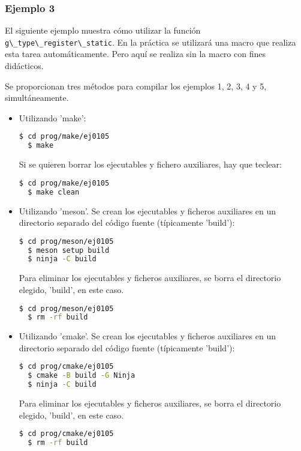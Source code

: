 \subsubsection{Ejemplo 3}
El siguiente ejemplo muestra cómo utilizar la función \passthrough{\lstinline!g\_type\_register\_static!}.
En la práctica se utilizará una macro que realiza esta tarea automáticamente. Pero aquí se realiza sin
la macro con fines didácticos.

Se proporcionan tres métodos para compilar los ejemplos 1, 2, 3, 4 y 5, simultáneamente.
\begin{itemize}
  \tightlist
\item Utilizando 'make':
\begin{lstlisting}[language=bash]
  $ cd prog/make/ej0105
  $ make
\end{lstlisting}
Si se quieren borrar los ejecutables y fichero auxiliares, hay que teclear:
\begin{lstlisting}[language=bash]
  $ cd prog/make/ej0105
  $ make clean
\end{lstlisting}
\item Utilizando 'meson'.
  Se crean los ejecutables y ficheros auxiliares en un directorio separado del código fuente
  (típicamente 'build'):
\begin{lstlisting}[language=bash]
  $ cd prog/meson/ej0105
  $ meson setup build
  $ ninja -C build
\end{lstlisting}
Para eliminar los ejecutables y ficheros auxiliares, se borra el directorio elegido, 'build', en este caso.
\begin{lstlisting}[language=bash]
  $ cd prog/meson/ej0105
  $ rm -rf build
\end{lstlisting}
\item Utilizando 'cmake'.
  Se crean los ejecutables y ficheros auxiliares en un directorio separado del código fuente
  (típicamente 'build'):
\begin{lstlisting}[language=bash]
  $ cd prog/cmake/ej0105
  $ cmake -B build -G Ninja
  $ ninja -C build
\end{lstlisting}
Para eliminar los ejecutables y ficheros auxiliares, se borra el directorio elegido, 'build', en este caso.
\begin{lstlisting}[language=bash]
  $ cd prog/cmake/ej0105
  $ rm -rf build
\end{lstlisting}
\end{itemize}

